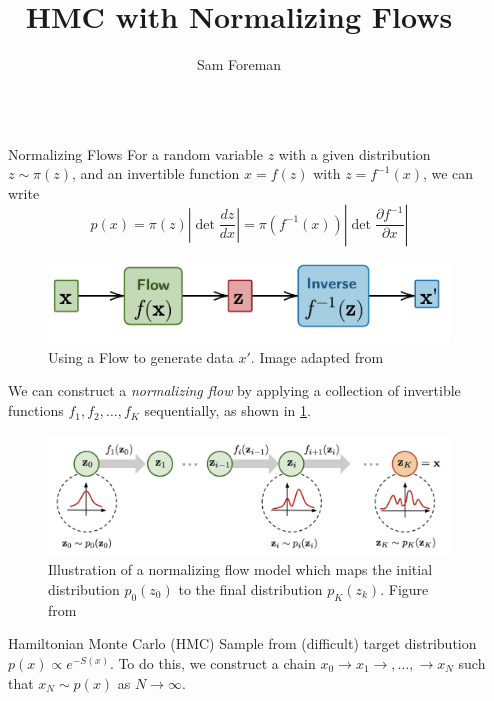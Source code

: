 \documentclass[final]{beamer}
\title{HMC with Normalizing Flows}
\author{Sam Foreman\inst{1}}
\institute[shortinst]{\inst{1} Argonne National Laboratory}
\newlength{\sepwidth}
\newlength{\colwidth}
\newcommand{\separatorcolumn}{\begin{column}{\sepwidth}\end{column}}
\begin{document}
\begin{frame}[t]
\begin{columns}[t]
\separatorcolumn

\begin{column}{\colwidth}

  \begin{block}{Normalizing Flows}
    For a random variable \(z\) with a given distribution \(z \sim \pi(z)\), and an invertible function \(x = f(z)\) with
    \(z = f^{-1}(x)\), we can write
    \begin{equation}
      p(x) = \pi(z)\left|\det \frac{dz}{dx}\right|%
        = \pi(f^{-1}(x))\left|\det\frac{\partial f^{-1}}{\partial x}\right|
    \end{equation}

    \begin{figure}
      \centering
      \includegraphics[width=0.8\columnwidth]{assets/flow_model2}
      \caption{Using a Flow to generate data \(x'\). Image adapted from~\cite{weng2018flow}}
    \end{figure}

    We can construct a \emph{normalizing flow} by applying a collection of invertible functions \(f_1, f_2, \ldots,
    f_K\) sequentially, as shown in \ref{fig:nflow}.

    \begin{figure}
      \centering
      \includegraphics[width=0.8\columnwidth]{assets/normalizing-flow.png}
      \caption{\label{fig:nflow}Illustration of a normalizing flow model which maps the initial distribution \(p_{0}(z_{0})\) to the
      final distribution \(p_{K}(z_{k})\). Figure from~\cite{weng2018flow}}
    \end{figure}

  \end{block}

  \begin{alertblock}{Hamiltonian Monte Carlo (HMC)}
    Sample from (difficult) target distribution \(p(x)\propto e^{-S(x)}\). To do this, we
      construct a chain \(x_{0}\rightarrow x_{1}\rightarrow, \ldots, \rightarrow x_{N}\) such that \(x_{N}\sim p(x)\)
      as \(N\rightarrow \infty\).


\end{alertblock}
\end{column}
\end{columns}
\end{frame}
\end{document}
